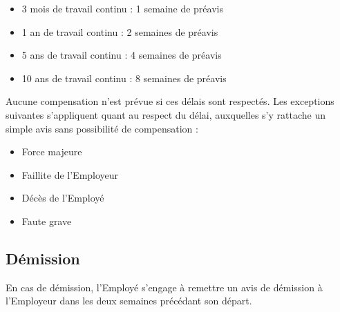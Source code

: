 \documentclass{article}
\begin{document}
	    \begin{itemize}
	    	\item 3 mois de travail continu : 1 semaine de préavis
	    	\item 1 an de travail continu : 2 semaines de préavis
	    	\item 5 ans de travail continu : 4 semaines de préavis
	    	\item 10 ans de travail continu : 8 semaines de préavis
	    \end{itemize}
	    
	    Aucune compensation n'est prévue si ces délais sont respectés. Les exceptions suivantes s'appliquent quant au respect du délai, auxquelles s'y rattache un simple avis sans possibilité de compensation : %
	    \begin{multicols}{2}
		    \begin{itemize}
		    	\item Force majeure
		    	\item Faillite de l'Employeur
		    	\item Décès de l'Employé
		    	\item Faute grave
		    \end{itemize}
		\end{multicols}
			    	
    	\subsection{Démission}
	    En cas de démission, l'Employé s'engage à remettre un avis de démission à l'Employeur dans les deux semaines précédant son départ.
    
    
    
    
    
    
    

    
    
        
\end{document}
